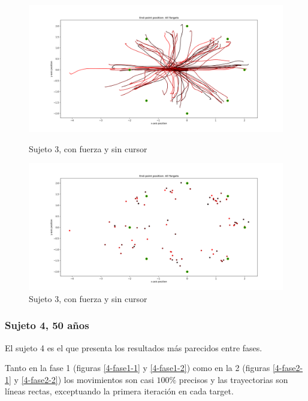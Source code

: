 \documentclass[a4paper,11pt, oneside]{book}
\begin{document}
\begin{figure}[H]
	\begin{minipage}[b]{0.5\linewidth}
		\centering
		\includegraphics[width=\linewidth]{sujeto3/force_no_cursor/trayectorias}
		\caption{Sujeto 3, con fuerza y sin cursor}
		\label{3-fase4-1}
	\end{minipage}
	\hspace{0.5cm}
	\begin{minipage}[b]{0.5\linewidth}
		\centering
		\includegraphics[width=\linewidth]{sujeto3/force_no_cursor/trayectorias_puntos}
		\caption{Sujeto 3, con fuerza y sin cursor}
		\label{3-fase4-2}
	\end{minipage}
\end{figure}



\subsubsection{Sujeto 4, 50 años}

El sujeto 4 es el que presenta los resultados más parecidos entre fases. 

Tanto en la fase 1 (figuras \ref{4-fase1-1} y \ref{4-fase1-2}) como en la 2 (figuras \ref{4-fase2-1} y \ref{4-fase2-2}) los movimientos son casi $100\%$ precisos y las trayectorias son líneas rectas, exceptuando la primera iteración en cada target.
\end{document}

